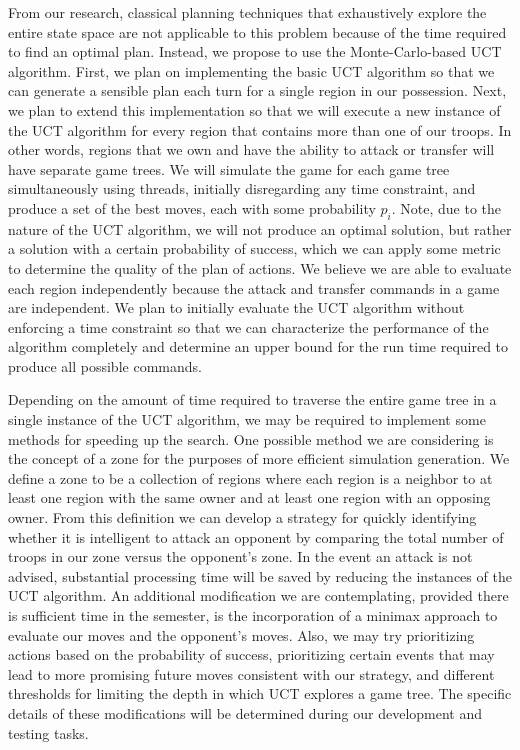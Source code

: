 \documentclass[a4paper,11pt]{article}
\begin{document}
From our research, classical planning techniques that exhaustively explore the entire state space are not applicable to this problem because of the time required to find an optimal plan. Instead, we propose to use the Monte-Carlo-based UCT algorithm.  First, we plan on implementing the basic UCT algorithm so that we can generate a sensible plan each turn for a single region in our possession.  Next, we plan to extend this implementation so that we will execute a new instance of the UCT algorithm for every region that contains more than one of our troops.  In other words, regions that we own and have the ability to attack or transfer will have separate game trees. We will simulate the game for each game tree simultaneously using threads, initially disregarding any time constraint, and produce a set of the best moves, each with some probability $p_{i}$. Note, due to the nature of the UCT algorithm, we will not produce an optimal solution, but rather a solution with a certain probability of success, which we can apply some metric to determine the quality of the plan of actions. We believe we are able to evaluate each region independently because the attack and transfer commands in a game are independent. We plan to initially evaluate the UCT algorithm without enforcing a time constraint so that we can characterize the performance of the algorithm completely and determine an upper bound for the run time required to produce all possible commands. 

Depending on the amount of time required to traverse the entire game tree in a single instance of the UCT algorithm, we may be required to implement some methods for speeding up the search. One possible method we are considering is the concept of a zone for the purposes of more efficient simulation generation.  We define a zone to be a collection of regions where each region is a neighbor to at least one region with the same owner and at least one region with an opposing owner.  From this definition we can develop a strategy for quickly identifying whether it is intelligent to attack an opponent by comparing the total number of troops in our zone versus the opponent's zone.  In the event an attack is not advised, substantial processing time will be saved by reducing the instances of the UCT algorithm.  An additional modification we are contemplating, provided there is sufficient time in the semester, is the incorporation of a minimax approach to evaluate our moves and the opponent's moves.  Also, we may try prioritizing actions based on the probability of success, prioritizing certain events that may lead to more promising future moves consistent with our strategy, and different thresholds for limiting the depth in which UCT explores a game tree. The specific details of these modifications will be determined during our development and testing tasks.
\end{document}
